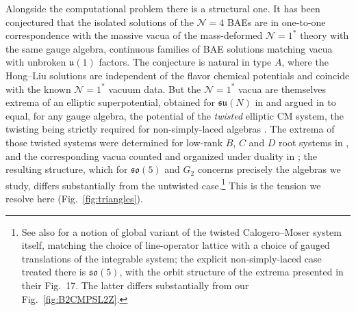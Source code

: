 \documentclass[aps, prx, nofootinbib, twocolumn,amsfonts,amsmath,amssymb,mathtools,superscriptaddress,preprintnumbers,floatfix,reprint]{revtex4-2}
\begin{document}
Alongside the computational problem there is a structural one. It has been
conjectured \cite{ArabiArdehali:2019orz,Benini:2021ano} that the isolated
solutions of the $\mathcal{N}=4$ BAEs are in one-to-one correspondence with the
massive vacua of the mass-deformed $\mathcal{N}=1^\ast$ theory with the same
gauge algebra, continuous families of BAE solutions matching vacua with
unbroken $\mathfrak{u}(1)$ factors. The conjecture is natural in type $A$, where
the Hong--Liu solutions \cite{Hosseini:2016cyf,Hong:2018viz} are independent of the flavor
chemical potentials and coincide with the known $\mathcal{N}=1^\ast$ vacuum
data. But the $\mathcal{N}=1^\ast$ vacua are themselves extrema of an elliptic
superpotential, obtained for $\mathfrak{su}(N)$ in \cite{Dorey:1999sj} and
argued in \cite{Kumar:2001iu} to equal, for any gauge algebra, the potential of
the \emph{twisted} elliptic CM system, the twisting being strictly required for
non-simply-laced algebras \cite{DHoker:1998zuv}. The extrema of those twisted
systems were determined for low-rank $B$, $C$ and $D$ root systems in
\cite{Bourget:2015cza}, and the corresponding vacua counted and organized under
duality in \cite{Bourget:2015lua,Bourget:2015upj,Bourget:2016yhy}; the
resulting structure, which for $\mathfrak{so}(5)$ and $G_2$ concerns precisely
the algebras we study, differs substantially from the untwisted case.\footnote{See
also \cite{Damia:2025bla} for a notion of global variant of the twisted
Calogero--Moser system itself, matching the choice of line-operator lattice
\cite{Aharony:2013hda} with a choice of gauged translations of the integrable
system; the explicit non-simply-laced case treated there is $\mathfrak{so}(5)$, with the orbit structure of the extrema presented in their Fig.~17. The latter differs substantially from our Fig.~\ref{fig:B2CMPSL2Z}.} This is
the tension we resolve here (Fig.~\ref{fig:triangles}).
\end{document}
